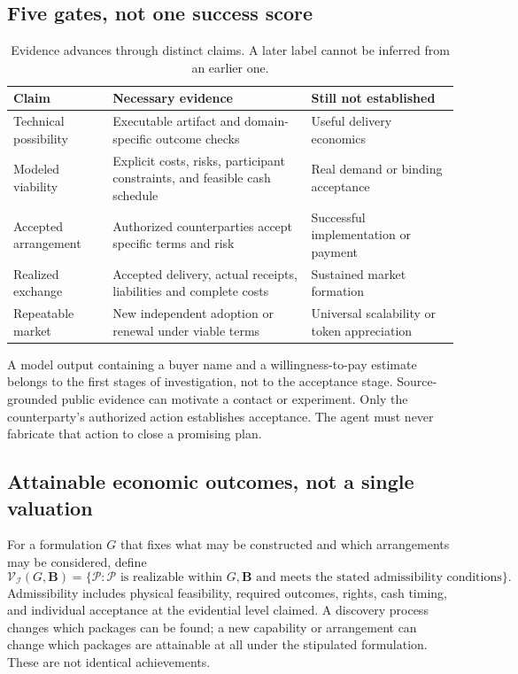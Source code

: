 \documentclass[11pt,letterpaper]{article}
\newcommand{\I}{\mathcal I}\newcommand{\K}{\mathcal K}
\newcommand{\Vset}{\mathcal V}\newcommand{\1}{\mathbf 1}
\theoremstyle{remark}\newtheorem{remark}{Remark}[section]
\begin{document}
\subsection{Five gates, not one success score}
\begin{table}[htbp]\centering\small
\caption{Evidence advances through distinct claims. A later label cannot be inferred from an earlier one.}\label{tab:gates}
\begin{tabularx}{\linewidth}{@{}P{.20\linewidth}YY@{}}\toprule
Claim & Necessary evidence & Still not established\\\midrule
Technical possibility & Executable artifact and domain-specific outcome checks & Useful delivery economics\\
Modeled viability & Explicit costs, risks, participant constraints, and feasible cash schedule & Real demand or binding acceptance\\
Accepted arrangement & Authorized counterparties accept specific terms and risk & Successful implementation or payment\\
Realized exchange & Accepted delivery, actual receipts, liabilities and complete costs & Sustained market formation\\
Repeatable market & New independent adoption or renewal under viable terms & Universal scalability or token appreciation\\\bottomrule
\end{tabularx}
\end{table}

A model output containing a buyer name and a willingness-to-pay estimate belongs to the first stages of investigation, not to the acceptance stage. Source-grounded public evidence can motivate a contact or experiment. Only the counterparty's authorized action establishes acceptance. The agent must never fabricate that action to close a promising plan.

\subsection{Attainable economic outcomes, not a single valuation}
For a formulation $G$ that fixes what may be constructed and which arrangements may be considered, define
\begin{equation}\label{eq:feasible-set}
\Vset_{\I}(G,\mathbf B)=\{\mathcal P:\mathcal P\text{ is realizable within }G,\mathbf B
\text{ and meets the stated admissibility conditions}\}.
\end{equation}
Admissibility includes physical feasibility, required outcomes, rights, cash timing, and individual acceptance at the evidential level claimed. A discovery process changes which packages can be found; a new capability or arrangement can change which packages are attainable at all under the stipulated formulation. These are not identical achievements.
\end{document}
